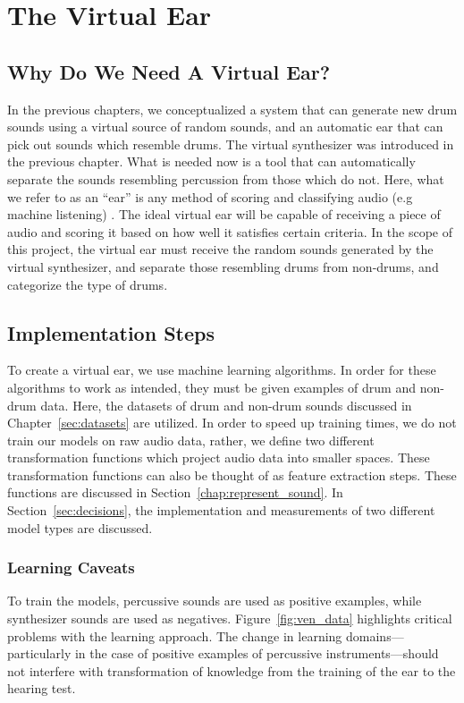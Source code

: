\documentclass[\main/thesis.tex]{subfiles}
\begin{document}
\chapter{The Virtual Ear}
\section{Why Do We Need A Virtual Ear?}
\label{sec:ear}
In the previous chapters, we conceptualized a system that can generate new drum sounds using a virtual source of random sounds, and an automatic ear that can pick out sounds which resemble drums. The virtual synthesizer was introduced in the previous chapter. What is needed now is a tool that can automatically separate the sounds resembling percussion from those which do not. Here, what we refer to as an \enquote{ear} is any method of scoring and classifying audio (e.g machine listening) \cite{malkin2006machine,rowe1992interactive}. The ideal virtual ear will be capable of receiving a piece of audio and scoring it based on how well it satisfies certain criteria. In the scope of this project, the virtual ear must receive the random sounds generated by the virtual synthesizer, and separate those resembling drums from non-drums, and categorize the type of drums. 
 
\section{Implementation Steps}
To create a virtual ear, we use machine learning algorithms. In order for these algorithms to work as intended, they must be given examples of drum and non-drum data. Here, the datasets of drum and non-drum sounds discussed in Chapter~\ref{sec:datasets} are utilized. In order to speed up training times, we do not train our models on raw audio data, rather, we define two different transformation functions which project audio data into smaller spaces. These transformation functions can also be thought of as feature extraction steps. These functions are discussed in Section~\ref{chap:represent_sound}. In Section~\ref{sec:decisions}, the implementation and measurements of two different model types are discussed.

\subsection{Learning Caveats}
\label{sec:ear_caveats}
To train the models, percussive sounds are used as positive examples, while synthesizer sounds are used as negatives. Figure~\ref{fig:ven_data} highlights critical problems with the learning approach. The change in learning domains---particularly in the case of positive examples of percussive instruments---should not interfere with transformation of knowledge from the training of the ear to the hearing test. 
\end{document}
